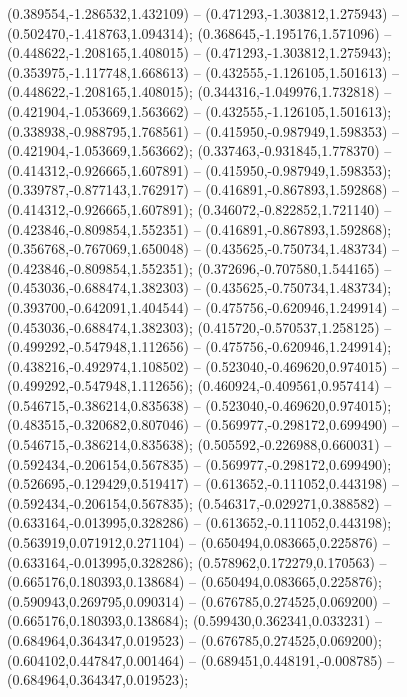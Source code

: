  (0.389554,-1.286532,1.432109) -- (0.471293,-1.303812,1.275943) -- (0.502470,-1.418763,1.094314);
 (0.368645,-1.195176,1.571096) -- (0.448622,-1.208165,1.408015) -- (0.471293,-1.303812,1.275943);
 (0.353975,-1.117748,1.668613) -- (0.432555,-1.126105,1.501613) -- (0.448622,-1.208165,1.408015);
 (0.344316,-1.049976,1.732818) -- (0.421904,-1.053669,1.563662) -- (0.432555,-1.126105,1.501613);
 (0.338938,-0.988795,1.768561) -- (0.415950,-0.987949,1.598353) -- (0.421904,-1.053669,1.563662);
 (0.337463,-0.931845,1.778370) -- (0.414312,-0.926665,1.607891) -- (0.415950,-0.987949,1.598353);
 (0.339787,-0.877143,1.762917) -- (0.416891,-0.867893,1.592868) -- (0.414312,-0.926665,1.607891);
 (0.346072,-0.822852,1.721140) -- (0.423846,-0.809854,1.552351) -- (0.416891,-0.867893,1.592868);
 (0.356768,-0.767069,1.650048) -- (0.435625,-0.750734,1.483734) -- (0.423846,-0.809854,1.552351);
 (0.372696,-0.707580,1.544165) -- (0.453036,-0.688474,1.382303) -- (0.435625,-0.750734,1.483734);
 (0.393700,-0.642091,1.404544) -- (0.475756,-0.620946,1.249914) -- (0.453036,-0.688474,1.382303);
 (0.415720,-0.570537,1.258125) -- (0.499292,-0.547948,1.112656) -- (0.475756,-0.620946,1.249914);
 (0.438216,-0.492974,1.108502) -- (0.523040,-0.469620,0.974015) -- (0.499292,-0.547948,1.112656);
 (0.460924,-0.409561,0.957414) -- (0.546715,-0.386214,0.835638) -- (0.523040,-0.469620,0.974015);
 (0.483515,-0.320682,0.807046) -- (0.569977,-0.298172,0.699490) -- (0.546715,-0.386214,0.835638);
 (0.505592,-0.226988,0.660031) -- (0.592434,-0.206154,0.567835) -- (0.569977,-0.298172,0.699490);
 (0.526695,-0.129429,0.519417) -- (0.613652,-0.111052,0.443198) -- (0.592434,-0.206154,0.567835);
 (0.546317,-0.029271,0.388582) -- (0.633164,-0.013995,0.328286) -- (0.613652,-0.111052,0.443198);
 (0.563919,0.071912,0.271104) -- (0.650494,0.083665,0.225876) -- (0.633164,-0.013995,0.328286);
 (0.578962,0.172279,0.170563) -- (0.665176,0.180393,0.138684) -- (0.650494,0.083665,0.225876);
 (0.590943,0.269795,0.090314) -- (0.676785,0.274525,0.069200) -- (0.665176,0.180393,0.138684);
 (0.599430,0.362341,0.033231) -- (0.684964,0.364347,0.019523) -- (0.676785,0.274525,0.069200);
 (0.604102,0.447847,0.001464) -- (0.689451,0.448191,-0.008785) -- (0.684964,0.364347,0.019523);
